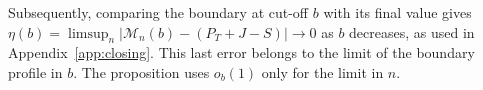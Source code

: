 Subsequently, comparing the boundary at cut-off \(b\) with its final value gives
\(\eta(b)=\limsup_n|\mathcal M_n(b)-(P_T+J-S)|\to0\) as \(b\) decreases, as used in
Appendix~\ref{app:closing}. This last error belongs to the limit of the boundary profile in \(b\). The
proposition uses \(o_b(1)\) only for the limit in \(n\).

